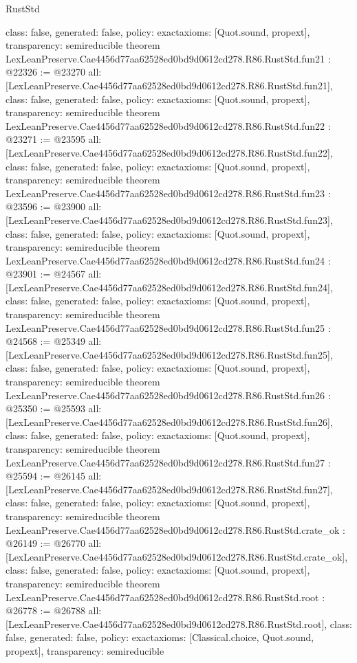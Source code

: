 \begin{lexlean}{RustStd}
\begin{coremodule}
{  class: false,
  generated: false,
  policy: exact{axioms: [Quot.sound, propext]},
  transparency: semireducible
}
theorem LexLeanPreserve.Cae4456d77aa62528ed0bd9d0612cd278.R86.RustStd.fun21 : @22326 := @23270 {
  all: [LexLeanPreserve.Cae4456d77aa62528ed0bd9d0612cd278.R86.RustStd.fun21],
  class: false,
  generated: false,
  policy: exact{axioms: [Quot.sound, propext]},
  transparency: semireducible
}
theorem LexLeanPreserve.Cae4456d77aa62528ed0bd9d0612cd278.R86.RustStd.fun22 : @23271 := @23595 {
  all: [LexLeanPreserve.Cae4456d77aa62528ed0bd9d0612cd278.R86.RustStd.fun22],
  class: false,
  generated: false,
  policy: exact{axioms: [Quot.sound, propext]},
  transparency: semireducible
}
theorem LexLeanPreserve.Cae4456d77aa62528ed0bd9d0612cd278.R86.RustStd.fun23 : @23596 := @23900 {
  all: [LexLeanPreserve.Cae4456d77aa62528ed0bd9d0612cd278.R86.RustStd.fun23],
  class: false,
  generated: false,
  policy: exact{axioms: [Quot.sound, propext]},
  transparency: semireducible
}
theorem LexLeanPreserve.Cae4456d77aa62528ed0bd9d0612cd278.R86.RustStd.fun24 : @23901 := @24567 {
  all: [LexLeanPreserve.Cae4456d77aa62528ed0bd9d0612cd278.R86.RustStd.fun24],
  class: false,
  generated: false,
  policy: exact{axioms: [Quot.sound, propext]},
  transparency: semireducible
}
theorem LexLeanPreserve.Cae4456d77aa62528ed0bd9d0612cd278.R86.RustStd.fun25 : @24568 := @25349 {
  all: [LexLeanPreserve.Cae4456d77aa62528ed0bd9d0612cd278.R86.RustStd.fun25],
  class: false,
  generated: false,
  policy: exact{axioms: [Quot.sound, propext]},
  transparency: semireducible
}
theorem LexLeanPreserve.Cae4456d77aa62528ed0bd9d0612cd278.R86.RustStd.fun26 : @25350 := @25593 {
  all: [LexLeanPreserve.Cae4456d77aa62528ed0bd9d0612cd278.R86.RustStd.fun26],
  class: false,
  generated: false,
  policy: exact{axioms: [Quot.sound, propext]},
  transparency: semireducible
}
theorem LexLeanPreserve.Cae4456d77aa62528ed0bd9d0612cd278.R86.RustStd.fun27 : @25594 := @26145 {
  all: [LexLeanPreserve.Cae4456d77aa62528ed0bd9d0612cd278.R86.RustStd.fun27],
  class: false,
  generated: false,
  policy: exact{axioms: [Quot.sound, propext]},
  transparency: semireducible
}
theorem LexLeanPreserve.Cae4456d77aa62528ed0bd9d0612cd278.R86.RustStd.crate_ok : @26149 := @26770 {
  all: [LexLeanPreserve.Cae4456d77aa62528ed0bd9d0612cd278.R86.RustStd.crate_ok],
  class: false,
  generated: false,
  policy: exact{axioms: [Quot.sound, propext]},
  transparency: semireducible
}
theorem LexLeanPreserve.Cae4456d77aa62528ed0bd9d0612cd278.R86.RustStd.root : @26778 := @26788 {
  all: [LexLeanPreserve.Cae4456d77aa62528ed0bd9d0612cd278.R86.RustStd.root],
  class: false,
  generated: false,
  policy: exact{axioms: [Classical.choice, Quot.sound, propext]},
  transparency: semireducible
}


\end{coremodule}
\end{lexlean}
